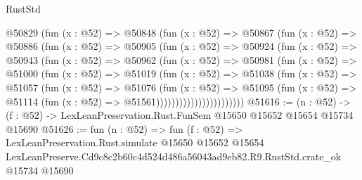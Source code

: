 \begin{lexlean}{RustStd}
\begin{coremodule}
                @50829
                  (fun (x : @52) =>
                  @50848
                    (fun (x : @52) =>
                    @50867
                      (fun (x : @52) =>
                      @50886
                        (fun (x : @52) =>
                        @50905
                          (fun (x : @52) =>
                          @50924
                            (fun (x : @52) =>
                            @50943
                              (fun (x : @52) =>
                              @50962
                                (fun (x : @52) =>
                                @50981
                                  (fun (x : @52) =>
                                  @51000
                                    (fun (x : @52) =>
                                    @51019
                                      (fun (x : @52) =>
                                      @51038
                                        (fun (x : @52) =>
                                        @51057
                                          (fun (x : @52) =>
                                          @51076
                                            (fun (x : @52) =>
                                            @51095
                                              (fun (x : @52) =>
                                              @51114 (fun (x : @52) => @51561)))))))))))))))))))))))
@51616 := (n : @52) ->
  (f : @52) -> LexLeanPreservation.Rust.FunSem @15650 @15652 @15654 @15734 @15690
@51626 := fun (n : @52) =>
  fun (f : @52) =>
  LexLeanPreservation.Rust.simulate
    @15650
    @15652
    @15654
    LexLeanPreserve.Cd9c8c2b60c4d524d486a56043ad9eb82.R9.RustStd.crate_ok
    @15734
    @15690
\end{coremodule}
\end{lexlean}

